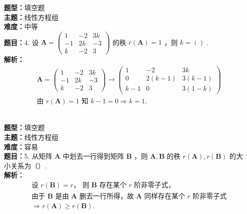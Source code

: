 \documentclass{ctexart}
\newenvironment{question}[5]{%
	\noindent\textbf{题型：}#1\\
	\textbf{主题：}#2\\
	\textbf{难度：}#3\\
	\textbf{题目：}#4\\
	\textbf{解析：}#5\\
	\vspace{1em}
}{}
\begin{document}
	\begin{question}
		{填空题}
		{线性方程组}
		{中等}
		{4. 设 \(\mathbf{A}=\left(\begin{array}{ccc}1 & -2 & 3k \\ -1 & 2k & -3 \\ k & -2 & 3\end{array}\right)\) 的秩 \(r(\mathbf{A})=1\) ，则 \(k=()\) . }
		{\[
			\begin{aligned}
				& \mathbf{A} = \left(\begin{array}{ccc}1 & -2 & 3k \\ -1 & 2k & -3 \\ k & -2 & 3\end{array}\right) \rightarrow \left(\begin{array}{ccc}1 & -2 & 3k \\ 0 & 2(k - 1) & 3(k - 1) \\ k - 1 & 0 & 3(1 - k)\end{array}\right) \\
				& \text{由 } r(\mathbf{A}) = 1 \text{ 知 } k - 1 = 0 \Rightarrow k = 1. 
			\end{aligned}
			\]}
	\end{question}
	
	\begin{question}
		{填空题}
		{线性方程组}
		{容易}
		{5. 从矩阵 \(\mathbf{A}\) 中划去一行得到矩阵 \(\mathbf{B}\) ，则 \(\mathbf{A}, \mathbf{B}\) 的秩 \(r(\mathbf{A}), r(\mathbf{B})\) 的大小关系为（）. }
		{\[
			\begin{aligned}
				& \text{设 } r(\mathbf{B}) = r，\text{ 则 } \mathbf{B} \text{ 存在某个 } r \text{ 阶非零子式，} \\
				& \text{由于 } \mathbf{B} \text{ 是由 } \mathbf{A} \text{ 删去一行所得，故 } \mathbf{A} \text{ 同样存在某个 } r \text{ 阶非零子式} \\
				& \Rightarrow r(\mathbf{A}) \geq r(\mathbf{B}). 
			\end{aligned}
			\]}
	\end{question}
	
\end{document}
